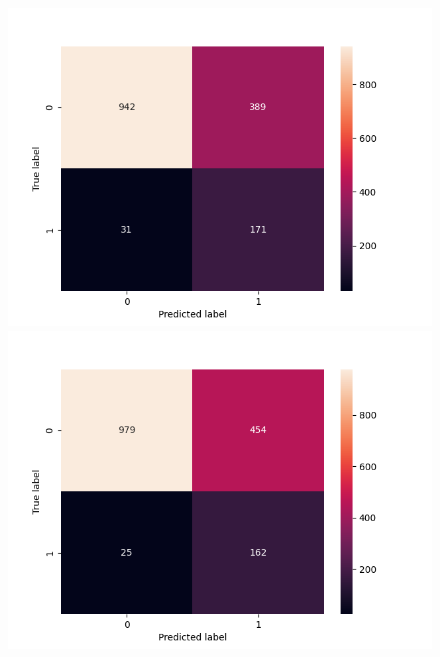 \begin{figure}[t!]
    \includegraphics[width=\linewidth]{figures/results/ad-hoc/nn/calibrate/2021-12-06_17.03.17.314982_set_1_confusion_matrix_raw.png}
    \endminipage
    \includegraphics[width=\linewidth]{figures/results/ad-hoc/nn/calibrate/2021-12-06_17.03.17.314982_set_2_confusion_matrix_raw.png}
    \endminipage
        

\end{figure}
